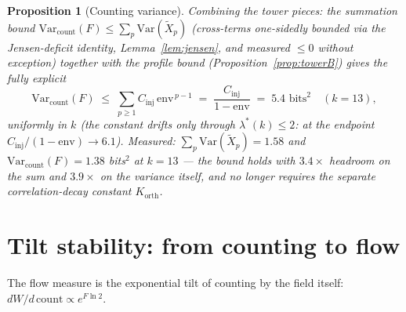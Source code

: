 \documentclass[11pt]{article}
\newtheorem{proposition}[theorem]{Proposition}
\theoremstyle{definition}
\newcommand{\Var}{\mathrm{Var}}
\newcommand{\lam}{\lambda}
\begin{document}
\begin{proposition}[Counting variance]\label{prop:vcount}
Combining the tower pieces: the summation bound
$\Var_{\mathrm{count}}(F) \le \sum_p \Var(\tilde X_p)$ (cross-terms
one-sidedly bounded via the Jensen-deficit identity,
Lemma~\ref{lem:jensen}, and measured $\le 0$ without exception) together
with the profile bound (Proposition~\ref{prop:towerB}) gives the fully
explicit
\[
\Var_{\mathrm{count}}(F) \;\le\; \sum_{p\ge 1} C_{\mathrm{inj}}\,
\mathrm{env}^{\,p-1} \;=\; \frac{C_{\mathrm{inj}}}{1-\mathrm{env}}
\;=\; 5.4 \text{ bits}^2 \quad (k=13),
\]
uniformly in $k$ (the constant drifts only through $\lam^*(k) \le 2$:
at the endpoint $C_{\mathrm{inj}}/(1-\mathrm{env}) \to 6.1$).
Measured: $\sum_p \Var(\tilde X_p) = 1.58$ and
$\Var_{\mathrm{count}}(F) = 1.38$ bits$^2$ at $k=13$ --- the bound holds
with $3.4\times$ headroom on the sum and $3.9\times$ on the variance
itself, and no longer requires the separate correlation-decay constant
$K_{\mathrm{orth}}$.
\end{proposition}

\section{Tilt stability: from counting to flow}

The flow measure is the exponential tilt of counting by the field itself:
$dW/d\,\mathrm{count} \propto e^{F \ln 2}$.
\end{document}
